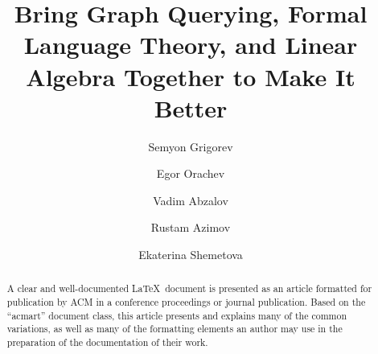 \documentclass[sigconf]{acmart}
\begin{document}
\title{Bring Graph Querying, Formal Language Theory, and Linear Algebra Together to Make It Better}

\author{Semyon Grigorev}

\author{Egor Orachev}

\author{Vadim Abzalov}

\author{Rustam Azimov}

\author{Ekaterina Shemetova}

\renewcommand{\shortauthors}{Trovato and Tobin, et al.}

\begin{abstract}
  A clear and well-documented \LaTeX\ document is presented as an
  article formatted for publication by ACM in a conference proceedings
  or journal publication. Based on the ``acmart'' document class, this
  article presents and explains many of the common variations, as well
  as many of the formatting elements an author may use in the
  preparation of the documentation of their work.
\end{abstract}
\end{document}

